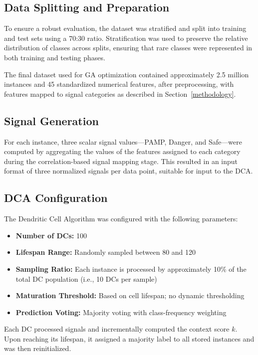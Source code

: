 \documentclass[conference]{IEEEtran}
\begin{document}
\subsection{Data Splitting and Preparation}

To ensure a robust evaluation, the dataset was stratified and split
into training and test sets using a 70:30 ratio. Stratification was
used to preserve the relative distribution of classes across splits,
ensuring that rare classes were represented in both training and
testing phases.

The final dataset used for GA optimization contained approximately
2.5 million instances and 45 standardized numerical features, after
preprocessing, with features mapped to signal categories as described in Section~\ref{methodology}.

\subsection{Signal Generation}

For each instance, three scalar signal values—PAMP, Danger, and
Safe—were computed by aggregating the values of the features assigned
to each category during the correlation-based signal mapping stage.
This resulted in an input format of three normalized signals per data
point, suitable for input to the DCA.

\subsection{DCA Configuration}

The Dendritic Cell Algorithm was configured with the following parameters:

\begin{itemize}
  \item \textbf{Number of DCs:} 100
  \item \textbf{Lifespan Range:} Randomly sampled between 80 and 120
  \item \textbf{Sampling Ratio:} Each instance is processed by
    approximately 10\% of the total DC population (i.e., 10 DCs per sample)
  \item \textbf{Maturation Threshold:} Based on cell lifespan; no
    dynamic thresholding
  \item \textbf{Prediction Voting:} Majority voting with
    class-frequency weighting
\end{itemize}

Each DC processed signals and incrementally computed the context
score $k$. Upon reaching its lifespan, it assigned a majority label
to all stored instances and was then reinitialized.
\end{document}
